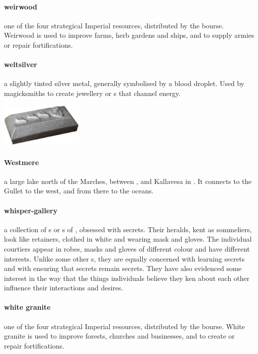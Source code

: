 \paragraph{weirwood} one of the four strategical Imperial resources, distributed by the bourse. Weirwood is used to improve farms, herb gardens and ships, and to supply armies or repair fortifications.
\paragraph{weltsilver} a slightly tinted silver metal, generally symbolised by a blood droplet. Used by magicksmiths to create jewellery or s that channel energy.\begin{center}\includegraphics[width=4cm]{encyclopedia/weltsilver}\end{center} 
\paragraph{Westmere} a large lake north of the Marches, between ,  and Kallavesa in . It connects to the Gullet to the west, and from there to the oceans.
\paragraph{whisper-gallery} a collection of s or s of , obsessed with secrets. Their heralds, kent as sommeliers, look like retainers, clothed in white and wearing mask and gloves. The individual courtiers appear in robes, masks and gloves of different colour and have different interests. Unlike some other  s, they are equally concerned with learning secrets and with ensuring that secrets remain secrets. They have also evidenced some interest in the way that the things individuals believe they ken about each other influence their interactions and desires.
\paragraph{white granite} one of the four strategical Imperial resources, distributed by the bourse. White granite is used to improve forests, churches and businesses, and to create or repair fortifications.
